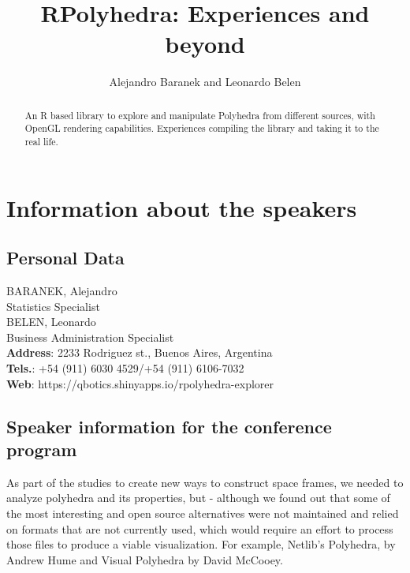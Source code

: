\documentclass[a4paper,10pt]{article}
\title{RPolyhedra: Experiences and beyond}
\author{Alejandro Baranek and Leonardo Belen}
\begin{document}
\maketitle
\thispagestyle{Title} 


\begin{abstract}
An R based library to explore and manipulate Polyhedra from different sources, with OpenGL rendering capabilities. Experiences compiling the library and taking it to the real life.  
\end{abstract}


\section{Information about the speakers}

\subsection{Personal Data}
BARANEK, Alejandro \\
Statistics Specialist \\
BELEN, Leonardo \\
Business Administration Specialist \\

\textbf{Address}: 2233 Rodriguez st., Buenos Aires, Argentina \\
\textbf{Tels.}: +54 (911) 6030 4529/+54 (911) 6106-7032\\
\textbf{Web}: https://qbotics.shinyapps.io/rpolyhedra-explorer \\



\subsection{Speaker information for the conference program}


As part of the studies to create new ways to construct space frames, we needed to analyze polyhedra and its properties, but - although we found out that some of the most interesting and open source alternatives were not maintained and relied on formats that are not currently used, which would require an effort to process those files to produce a viable visualization. For example, Netlib's Polyhedra\cite{NETLIB}, by Andrew Hume and Visual Polyhedra\cite{DMCCOOEY} by David McCooey. 
\end{document}
